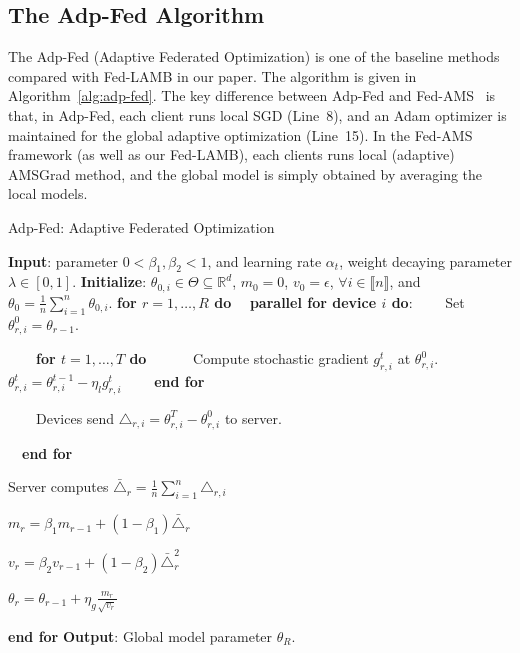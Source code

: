 \documentclass[nohyperref]{article}
\theoremstyle{plain}
\theoremstyle{definition}
\theoremstyle{remark}
\begin{document}
\subsection{The Adp-Fed Algorithm~\citep{reddi2020adaptive}}

The Adp-Fed (Adaptive Federated Optimization) is one of the baseline methods compared with Fed-LAMB in our paper. The algorithm is given in Algorithm~\ref{alg:adp-fed}. The key difference between Adp-Fed and Fed-AMS~\citep{chen2020toward} is that, in Adp-Fed, each client runs local SGD (Line~8), and an Adam optimizer is maintained for the global adaptive optimization (Line~15). In the Fed-AMS framework (as well as our Fed-LAMB), each clients runs local (adaptive) AMSGrad method, and the global model is simply obtained by averaging the local models.


\begin{algorithm}[H]
\caption{Adp-Fed: Adaptive Federated Optimization~\citep{reddi2020adaptive}} \label{alg:adp-fed}
\begin{algorithmic}[1]
\STATE \textbf{Input}: parameter $0< \beta_1, \beta_2 <1$, and learning rate $\alpha_t$, weight decaying parameter $\lambda \in [0,1]$.
\STATE \textbf{Initialize}: $\theta_{0,i} \in \Theta \subseteq \mathbb R^d $, $m_0=0$, $v_{0} =\epsilon$, $\forall i\in \llbracket n\rrbracket$, and $\theta_0 =  \frac{1}{n} \sum_{i=1}^n \theta_{0,i}$.
\vspace{0.05in}
\STATE \textbf{for $r=1, \ldots, R$ do}
\STATE $\quad$\textbf{parallel for device $i$ do}:
\STATE $\qquad$Set $\theta_{r,i}^{0} = \theta_{r-1}$.

\STATE $\qquad$\textbf{for $t=1, \ldots, T$ do}
\STATE $\qquad\quad$Compute stochastic gradient $g^t_{r,i}$ at $\theta_{r,i}^{0}$.
\STATE $\qquad\quad$$\theta_{r,i}^t=\theta_{r,i}^{t-1}-\eta_l g_{r,i}^t$ \label{adpfed line:local SGD} 
\STATE $\qquad$\textbf{end for}


\STATE $\qquad$Devices send $\triangle_{r,i}=\theta_{r,i}^T-\theta_{r,i}^0$ to server.

\STATE $\quad$\textbf{end for}

\STATE \quad Server computes $\bar{\triangle}_r = \frac{1}{n}\sum_{i=1}^n \triangle_{r,i}$

\STATE \quad $m_r = \beta_1 m_{r-1} + (1-\beta_1)\bar{\triangle}_r$

\STATE \quad $v_r = \beta_2 v_{r-1} + (1-\beta_2)\bar{\triangle}_r^2$

\STATE \quad $\theta_r = \theta_{r-1}+\eta_g\frac{m_r}{\sqrt{v_r}}$ \label{adpfed line:global adam}

\STATE \textbf{end for}
\STATE \textbf{Output}: Global model parameter $\theta_R$.
\end{algorithmic}
\end{algorithm}
\end{document}
